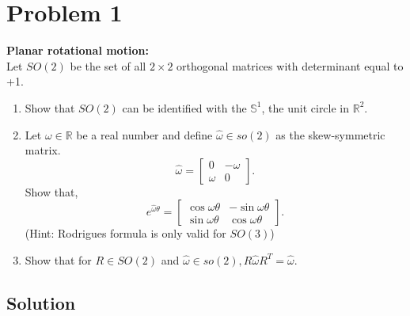 \section*{Problem 1}

\textbf{Planar rotational motion:}\\
Let \( S O(2) \) be the set of all \( 2 \times 2 \) orthogonal matrices with determinant equal to +1.
\begin{enumerate}[label= (\alph*), noitemsep]
    \item Show that \( S O(2) \) can be identified with the \( \mathbb{S}^{1} \), the unit circle in \( \mathbb{R}^{2} \).

    \item Let \( \omega \in \mathbb{R} \) be a real number and define \( \widehat{\omega} \in s o(2) \) as the skew-symmetric matrix.
          \[
              \widehat{\omega}=\left[\begin{array}{cc}
                      0      & -\omega \\
                      \omega & 0
                  \end{array}\right] .
          \]
          Show that,
          \[
              e^{\widehat{\omega} \theta}=\left[\begin{array}{cc}
                      \cos \omega \theta & -\sin \omega \theta \\
                      \sin \omega \theta & \cos \omega \theta
                  \end{array}\right] .
          \]
          (Hint: Rodrigues formula is only valid for \( S O(3) \))

    \item Show that for \( R \in S O(2) \) and \( \widehat{\omega} \in s o(2), R \widehat{\omega} R^{T}=\widehat{\omega} \).
\end{enumerate}

\subsection*{Solution}
